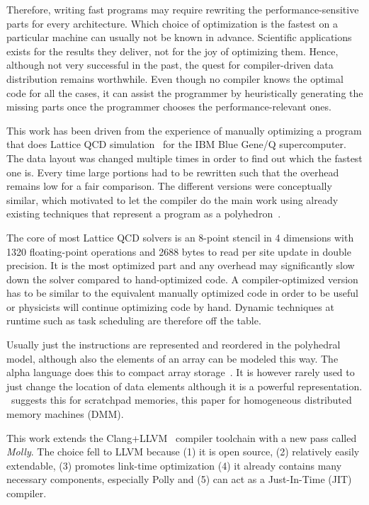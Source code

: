 \documentclass{sigplanconf}
\begin{document}
Therefore, writing fast programs may require rewriting the performance-sensitive parts for every architecture. Which choice of optimization is the fastest on a particular machine can usually not be known in advance. Scientific applications exists for the results they deliver, not for the joy of optimizing them. Hence, although not very successful in the past, the quest for compiler-driven data distribution remains worthwhile. Even though no compiler knows the optimal code for all the cases, it can assist the programmer by heuristically generating the missing parts once the programmer chooses the performance-relevant ones.

This work has been driven from the experience of manually optimizing a program that does Lattice QCD simulation~\cite{tmlqcd,bonati13} for the IBM Blue Gene/Q supercomputer. The data layout was changed multiple times in order to find out which the fastest one is. Every time large portions had to be rewritten such that the overhead remains low for a fair comparison. The different versions were conceptually similar, which motivated to let the compiler do the main work using already existing techniques that represent a program as a polyhedron~\cite{fautrier92a,fautrier92b,darte00}. 

The core of most Lattice QCD solvers is an 8-point stencil in 4 dimensions with 1320 floating-point operations and 2688 bytes to read per site update in double precision. It is the most optimized part and any overhead may significantly slow down the solver compared to hand-optimized code. A compiler-optimized version has to be similar to the equivalent manually optimized code in order to be useful or physicists will continue optimizing code by hand. Dynamic techniques at runtime such as task scheduling are therefore off the table. 

Usually just the instructions are represented and reordered in the polyhedral model, although also the elements of an array can be modeled this way. The alpha language does this to compact array storage~\cite{mauras90,quillere02}. It is however rarely used to just change the location of data elements although it is a powerful representation. \cite{grosslinger09}~suggests this for scratchpad memories, this paper for homogeneous distributed memory machines (DMM).

This work extends the Clang+LLVM~\cite{llvm,clang} compiler toolchain with a new pass called \emph{Molly}. The choice fell to LLVM because (1) it is open source, (2) relatively easily extendable, (3) promotes link-time optimization (4) it already contains many necessary components, especially Polly and (5) can act as a Just-In-Time (JIT) compiler.
\end{document}

